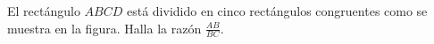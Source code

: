 El rectángulo $ABCD$ está dividido en cinco rectángulos congruentes como se muestra en la figura. Halla la razón $\frac{AB}{BC}$.